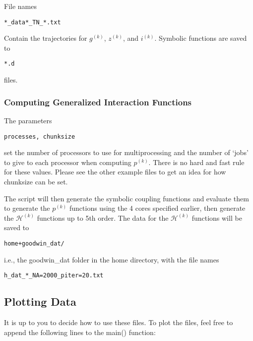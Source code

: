 \documentclass[english,a4paper,oneside]{article}
\begin{document}
File names

\begin{verbatim}
*_data*_TN_*.txt 
\end{verbatim}

Contain the trajectories for \(g^{(k)}\), \(z^{(k)}\), and \(i^{(k)}\).
Symbolic functions are saved to

\begin{verbatim}
*.d
\end{verbatim}

files.

\hypertarget{computing-generalized-interaction-functions}{%
\subsubsection{Computing Generalized Interaction
Functions}\label{computing-generalized-interaction-functions}}

The parameters

\begin{verbatim}
processes, chunksize
\end{verbatim}

set the number of processors to use for multiprocessing and the number
of `jobs' to give to each processor when computing \(p^{(k)}\). There is
no hard and fast rule for these values. Please see the other example
files to get an idea for how chunksize can be set.

The script will then generate the symbolic coupling functions and
evaluate them to generate the \(p^{(k)}\) functions using the 4 cores
specified earlier, then generate the \(\mathcal{H}^{(k)}\) functions up
to 5th order. The data for the \(\mathcal{H}^{(k)}\) functions will be
saved to

\begin{verbatim}
home+goodwin_dat/
\end{verbatim}

i.e., the goodwin\_dat folder in the home directory, with the file names

\begin{verbatim}
h_dat_*_NA=2000_piter=20.txt
\end{verbatim}

\hypertarget{plotting-data}{%
\subsection{Plotting Data}\label{plotting-data}}

It is up to you to decide how to use these files. To plot the files,
feel free to append the following lines to the main() function:
\end{document}
